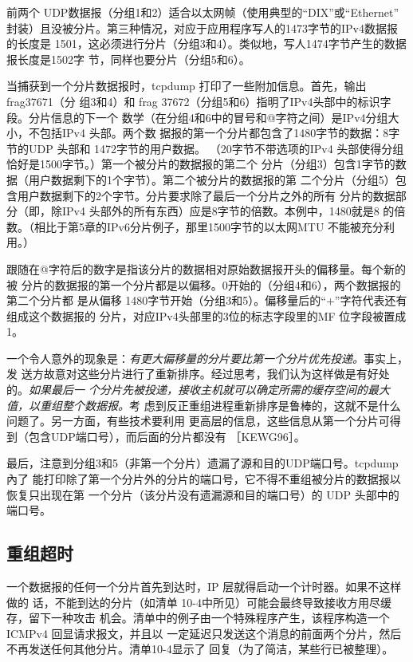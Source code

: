 前两个 UDP数据报（分组1和2）适合以太网帧（使用典型的“DIX”或“Ethernet”
封装）且没被分片。第三种情况，对应于应用程序写人的1473字节的IPv4数据报的长度是
1501，这必须进行分片（分组3和4）。类似地，写人1474字节产生的数据报长度是1502字
节，同样也要分片（分组5和6）。

当捕获到一个分片数据报时，tcpdump 打印了一些附加信息。首先，输出 frag37671（分
组3和4）和 frag 37672（分组5和6）指明了IPv4头部中的标识字段。分片信息的下一个
数学（在分组4和6中的冒号和@字符之间）是IPv4分组大小，不包括IPv4 头部。两个数
据报的第一个分片都包含了1480字节的数据：8字节的UDP 头部和 1472字节的用户数据。
（20字节不带选项的IPv4 头部使得分组恰好是1500字节。）第一个被分片的数据报的第二个
分片（分组3）包含1字节的数据（用户数据剩下的1个字节）。第二个被分片的数据报的第
二个分片（分组5）包含用户数据剩下的2个字节。分片要求除了最后一个分片之外的所有
分片的数据部分（即，除IPv4 头部外的所有东西）应是8字节的倍数。本例中，1480就是8
的倍数。（相比于第5章的IPv6分片例子，那里1500字节的以太网MTU 不能被充分利用。）

跟随在@字符后的数字是指该分片的数据相对原始数据报开头的偏移量。每个新的被
分片的数据报的第一个分片都是以偏移。0开始的（分组4和6），两个数据报的第二个分片都
是从偏移 1480字节开始（分组3和5）。偏移量后的“+”字符代表还有组成这个数据报的
分片，对应IPv4头部里的3位的标志字段里的MF 位字段被置成1。

一个令人意外的现象是：\emph{有更大偏移量的分片要比第一个分片优先投递。}事实上，发
送方故意对这些分片进行了重新排序。经过思考，我们认为这样做是有好处的。\emph{如果最后一
个分片先被投递，接收主机就可以确定所需的缓存空间的最大值，以重组整个数据报。}考
虑到反正重组进程重新排序是鲁棒的，这就不是什么问题了。另一方面，有些技术要利用
更高层的信息，这些信息从第一个分片可得到（包含UDP端口号），而后面的分片都没有
［KEWG96］。

最后，注意到分组3和5（非第一个分片）遗漏了源和目的UDP端口号。tcpdump 內了
能打印除了第一个分片外的分片的端口号，它不得不重组被分片的数据报以恢复只出现在第
一个分片（该分片没有遗漏源和目的端口号）的 UDP 头部中的端口号。

\subsection{重组超时}
一个数据报的任何一个分片首先到达时，IP 层就得启动一个计时器。如果不这样做的
话，不能到达的分片（如清单 10-4中所见）可能会最终导致接收方用尽缓存，留下一种攻击
机会。清单中的例子由一个特殊程序产生，该程序构造一个ICMPv4 回显请求报文，并且以
一定延迟只发送这个消息的前面两个分片，然后不再发送任何其他分片。清单10-4显示了
回复（为了简洁，某些行已被整理）。

